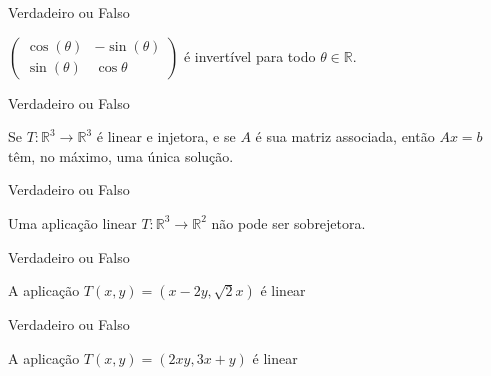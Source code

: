 \documentclass{beamer}
\begin{document}
\begin{frame}{Verdadeiro ou Falso}
  \begin{block}{1}
$\begin{pmatrix}
  \cos(\theta) & -\sin(\theta) \\
  \sin(\theta) & \cos{\theta}
\end{pmatrix}$ é invertível para todo $\theta \in \mathbb{R}.$
\end{block}
\end{frame}

\begin{frame}{Verdadeiro ou Falso}
  \begin{block}{2}
Se $T : \mathbb{R}^3 \to \mathbb{R}^3$ é linear e injetora,
e se $A$ é sua matriz associada, então $Ax=b$ têm, no máximo,
uma única solução.
\end{block}
\end{frame}

\begin{frame}{Verdadeiro ou Falso}
  \begin{block}{3}
  Uma aplicação linear $T:\mathbb{R}^3 \to \mathbb{R}^2$ não pode ser sobrejetora.
  \end{block}
\end{frame}


\begin{frame}{Verdadeiro ou Falso}
  \begin{block}{4}
  A aplicação $T(x,y) = (x -2y, \sqrt{2}x)$ é linear
  \end{block}
\end{frame}

\begin{frame}{Verdadeiro ou Falso}
  \begin{block}{5}
  A aplicação $T(x,y) = (2xy, 3x+y)$ é linear
  \end{block}
\end{frame}
\end{document}
